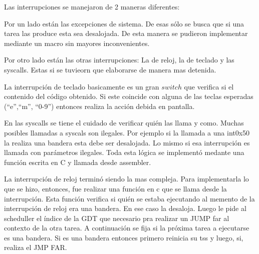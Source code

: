 	Las interrupciones se manejaron de 2 maneras diferentes:

	Por un lado están las excepciones de sistema. De esas sólo se busca
que si una tarea las produce esta sea desalojada. De esta manera se pudieron
implementar mediante un macro sin mayores inconvenientes.

	Por otro lado están las otras interrupciones: La de reloj, la de teclado
y las syscalls. Estas si se tuvieorn que elaborarse de manera mas detenida.

	La interrupción de teclado basicamente es un gran $switch$ que verifica si
el contenido del código obtenido. Si este coincide con alguna de las teclas esperadas
(``e'',``m'', ``0-9'') entonces realiza la acción debida en pantalla.

	En las syscalls se tiene el cuidado de verificar quién las llama y como. Muchas
posibles llamadas a syscals son ilegales. Por ejemplo si la llamada a una int0x50 la realiza
una bandera esta debe ser desalojada. Lo mismo si esa interrupción es llamada con parámetros ilegales.
Toda esta lógica se implementó medante una función escrita en C y llamada desde assembler.

	La interrupción de reloj terminó siendo la mas compleja. Para implementarla lo que se hizo, entonces,
fue realizar una función en c que se llama desde la interrupción. Esta función verifica si quién
se estaba ejecutando al memento de la interrupción de reloj era una bandera. En ese caso la desaloja.
Luego le pide al scheduller el índice de la GDT que necesario pra realizar un JUMP far al contexto
de la otra tarea. A continuación se fija si la próxima tarea a ejecutarse es una bandera. Si es una bandera
entonces primero reinicia su tss y luego, si, realiza el JMP FAR.

	
